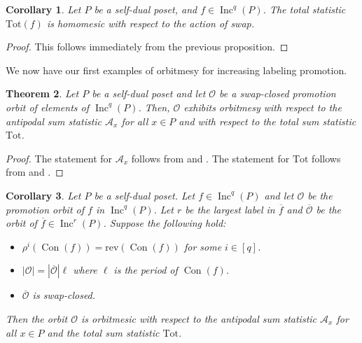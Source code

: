 \documentclass[11pt]{amsart}
\newtheorem{theorem}{Theorem}[section]
\newtheorem{corollary}[theorem]{Corollary}
\theoremstyle{definition}
\newcommand{\as}{\mathcal{A}}
\newcommand{\tot}{\mathrm{Tot}}
\newcommand{\rev}{\mathrm{rev}}
\DeclareMathOperator{\Inc}{\mathrm{Inc}}
\DeclareMathOperator{\Con}{\mathrm{Con}}
\begin{document}
\begin{corollary}\label{prop:swap-homomesy-total}
Let $P$ be a self-dual poset, and $f\in \Inc^q(P)$.
The total statistic $\tot(f)$ is homomesic with respect to the action of swap.
\end{corollary}
\begin{proof}
This follows immediately from the previous proposition.
\end{proof}

We now have our first examples of orbitmesy for increasing labeling promotion.

\begin{theorem}
\label{thm:swap_orbitmesy}
Let $P$ be a self-dual poset and let $\mathcal{O}$ be a swap-closed promotion orbit of elements of $\Inc^q(P)$. Then, $\mathcal{O}$ exhibits orbitmesy with respect to the antipodal sum statistic $\mathcal{A}_x$ for all $x \in P$ and with respect to the total sum statistic $\tot$.
\end{theorem}

\begin{proof}
    The statement for $\mathcal{A}_x$ follows from  and .  The statement for $\tot$ follows from  and .
\end{proof}

\begin{corollary}\label{cor:swap-deflation-orbitmesy}
    Let $P$ be a self-dual poset.  Let $f\in\Inc^q(P)$ and let $\mathcal{O}$ be the promotion orbit of $f$ in $\Inc^q(P)$.  Let $r$ be the largest label in $\overline{f}$ and $\overline{\mathcal{O}}$ be the orbit of $\overline{f}\in\Inc^r(P)$.  Suppose the following hold:
    \begin{itemize}
        \item $\rho^i(\Con(f))=\rev(\Con(f))$ for some $i\in[q]$.
        \item $|\mathcal{O}|=|\overline{\mathcal{O}}| \ell$ where $\ell$ is the period of $\Con(f)$.
        \item $\overline{\mathcal{O}}$ is swap-closed.
    \end{itemize}
    Then the orbit $\mathcal{O}$ is orbitmesic with respect to the antipodal sum statistic $\as_x$ for all $x\in P$ and the total sum statistic $\tot$.
\end{corollary}
\end{document}
